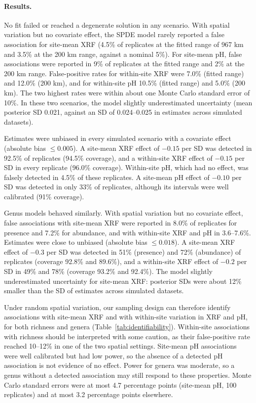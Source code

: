 \documentclass[11pt]{article}
\begin{document}
\paragraph{Results.}
No fit failed or reached a degenerate solution in any scenario. With spatial variation but no covariate effect, the SPDE model rarely reported a false association for site-mean XRF (4.5\% of replicates at the fitted range of 967 km and 3.5\% at the 200 km range, against a nominal 5\%). For site-mean pH, false associations were reported in 9\% of replicates at the fitted range and 2\% at the 200 km range. False-positive rates for within-site XRF were 7.0\% (fitted range) and 12.0\% (200 km), and for within-site pH 10.5\% (fitted range) and 5.0\% (200 km). The two highest rates were within about one Monte Carlo standard error of 10\%. In these two scenarios, the model slightly underestimated uncertainty (mean posterior SD 0.021, against an SD of 0.024--0.025 in estimates across simulated datasets).

Estimates were unbiased in every simulated scenario with a covariate effect (absolute bias $\leq 0.005$). A site-mean XRF effect of $-0.15$ per SD was detected in 92.5\% of replicates (94.5\% coverage), and a within-site XRF effect of $-0.15$ per SD in every replicate (96.0\% coverage). Within-site pH, which had no effect, was falsely detected in 4.5\% of these replicates. A site-mean pH effect of $-0.10$ per SD was detected in only 33\% of replicates, although its intervals were well calibrated (91\% coverage).

Genus models behaved similarly. With spatial variation but no covariate effect, false associations with site-mean XRF were reported in 8.0\% of replicates for presence and 7.2\% for abundance, and with within-site XRF and pH in 3.6--7.6\%. Estimates were close to unbiased (absolute bias $\leq 0.018$). A site-mean XRF effect of $-0.3$ per SD was detected in 51\% (presence) and 72\% (abundance) of replicates (coverage 92.8\% and 89.6\%), and a within-site XRF effect of $-0.2$ per SD in 49\% and 78\% (coverage 93.2\% and 92.4\%). The model slightly underestimated uncertainty for site-mean XRF: posterior SDs were about 12\% smaller than the SD of estimates across simulated datasets.

Under random spatial variation, our sampling design can therefore identify associations with site-mean XRF and with within-site variation in XRF and pH, for both richness and genera (Table~\ref{tab:identifiability}). Within-site associations with richness should be interpreted with some caution, as their false-positive rate reached 10--12\% in one of the two spatial settings. Site-mean pH associations were well calibrated but had low power, so the absence of a detected pH association is not evidence of no effect. Power for genera was moderate, so a genus without a detected association may still respond to these properties. Monte Carlo standard errors were at most 4.7 percentage points (site-mean pH, 100 replicates) and at most 3.2 percentage points elsewhere.
\end{document}
